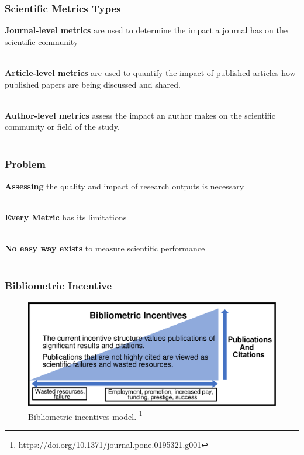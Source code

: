 \documentclass{beamer}
\begin{document}
\begin{frame}

    \frametitle{Scientific Metrics Types}
     \textbf{Journal-level metrics} are used to determine the impact a journal has on the scientific community\\~\

     \textbf{Article-level metrics} are used to quantify the impact of published articles-how published papers are being discussed and shared.\\~\

    \textbf{Author-level metrics} assess the impact an author makes on the scientific community or field of the study.\\~\

\end{frame}
\begin{frame}

    \frametitle{Problem}

    \textbf{Assessing} the quality and impact of research outputs is necessary \\~\



     \textbf{Every Metric} has its limitations\\~\



    \textbf{No easy way exists} to measure scientific performance\\~\


\end{frame}

\begin{frame}

    \frametitle{Bibliometric Incentive}

    \begin{figure}[h]
        \includegraphics[height=0.5\textheight]{1.png}
        \caption{Bibliometric incentives model. \footnote{https://doi.org/10.1371/journal.pone.0195321.g001}}
    \end{figure}

\end{frame}
\end{document}
